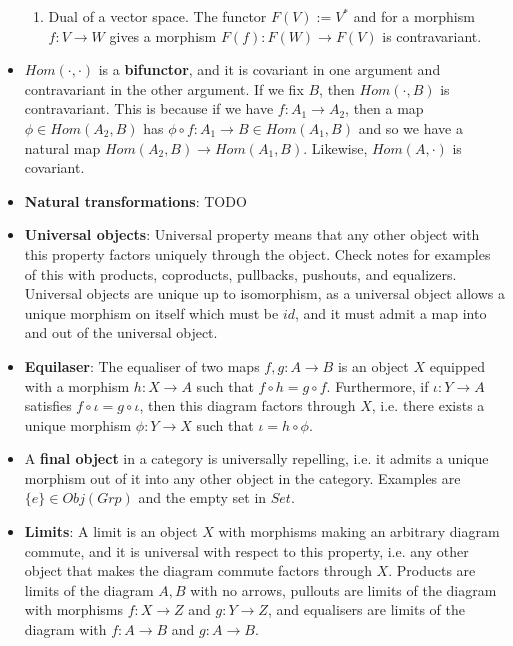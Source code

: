 \documentclass[11pt, oneside]{amsart}   	%
\theoremstyle{definition}
\begin{document}
\begin{itemize}
\begin{enumerate}
			\item Dual of a vector space. The functor $F(V) := V^*$ and for a morphism $f : V\rightarrow W$ gives a morphism $F(f) : F(W)
			\rightarrow F(V)$ is contravariant.
		
		\end{enumerate}
	
	\item $Hom(\cdot, \cdot)$ is a \textbf{bifunctor}, and it is covariant in one argument and contravariant in the other argument. If we fix $B$, then 
	$Hom(\cdot, B)$ is contravariant. This is because if we have $f : A_1\rightarrow A_2$, then a map $\phi\in Hom(A_2, B)$ has $\phi\circ f : A_1 
	\rightarrow B\in Hom(A_1, B)$ and so we have a natural map $Hom(A_2, B)\rightarrow Hom(A_1, B)$. Likewise, $Hom(A, \cdot)$ is covariant.
	
	\item \textbf{Natural transformations}: TODO
	
	\item \textbf{Universal objects}: Universal property means that any other object with this property factors uniquely through the object. Check notes 
	for examples of this with products, coproducts, pullbacks, pushouts, and equalizers. Universal objects are unique up to isomorphism, as a 
	universal object allows a unique morphism on itself which must be $id$, and it must admit a map into and out of the universal object.
	
	\item \textbf{Equilaser}: The equaliser of two maps $f, g : A\rightarrow B$ is an object $X$ equipped with a morphism $h : X\rightarrow A$ such 
	that $f\circ h= g\circ f$. Furthermore, if $\iota : Y\rightarrow A$ satisfies $f\circ\iota = g\circ\iota$, then this diagram factors through $X$, i.e. there 
	exists a unique morphism $\phi : Y\rightarrow X$ such that $\iota = h\circ\phi$.
	
	\item A \textbf{final object} in a category is universally repelling, i.e. it admits a unique morphism out of it into any other object in the category. 
	Examples are $\{e\}\in Obj(Grp)$ and the empty set in $Set$.
	
	\item \textbf{Limits}: A limit is an object $X$ with morphisms making an arbitrary diagram commute, and it is universal with respect to this property, 
	i.e. any other object that makes the diagram commute factors through $X$. Products are limits of the diagram $A, B$ with no arrows, pullouts 
	are limits of the diagram with morphisms $f : X\rightarrow Z$ and $g : Y\rightarrow Z$, and equalisers are limits of the diagram with $f : A
	\rightarrow B$ and $g : A\rightarrow B$. 
	

\end{itemize}
\end{document}
